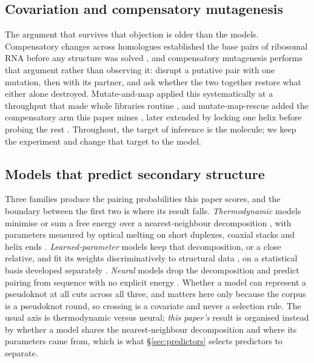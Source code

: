 \documentclass[11pt]{article}
\begin{document}
\subsection{Covariation and compensatory mutagenesis}
The argument that survives that objection is older than the models. Compensatory changes across
homologues established the base pairs of ribosomal RNA before any structure was solved
\citep{gutell1994lessons,michel1990modelling}, and compensatory mutagenesis performs that argument
rather than observing it: disrupt a putative pair with one mutation, then with its partner, and ask
whether the two together restore what either alone destroyed. Mutate-and-map
applied this systematically \citep{kladwang2011mutate,kladwang2011two,cordero2015rich,
cordero2015rna} at a throughput that made whole libraries routine
\citep{tian2014high,leppek2022combinatorial}, and mutate-map-rescue added the compensatory arm this
paper mines \citep{tian2014correcting,cheng2017rna}, later extended by locking one helix before
probing the rest \citep{tian2018allosteric}. Throughout, the target of inference is the molecule;
we keep the experiment and change that target to the model.

\subsection{Models that predict secondary structure}
\label{sec:models}
Three families produce the pairing probabilities this paper scores, and the boundary between the
first two is where its result falls. \emph{Thermodynamic} models minimise or sum a free energy over
a nearest-neighbour decomposition \citep{zuker1981optimal,mccaskill1990equilibrium,
hofacker1994fast,lorenz2011vienna}, with parameters measured by optical melting on short duplexes,
coaxial stacks and helix ends \citep{freier1986improved,walter1994coaxial,serra1995predicting,
xia1998thermodynamic,mathews1999expanded,turner2010nndb}. \emph{Learned-parameter} models keep that
decomposition, or a close relative, and fit its weights discriminatively to structural data
\citep{do2006contrafold,andronescu2007efficient,waymentsteele2022rna}, on a statistical basis
developed separately \citep{waymentsteele2021theoretical}. \emph{Neural} models drop the
decomposition and predict pairing from sequence with no explicit energy \citep{singh2019spotrna,
sato2021rna,fu2022ufold,ribonanzanet2024}. Whether a model can represent a pseudoknot at all
\citep{rivas1999dynamic,reeder2004design,bellaousov2010probknot,janssen2015pkiss} cuts across all
three, and matters here only because the corpus is a pseudoknot round, so crossing is a covariate
and never a selection rule. The usual axis is thermodynamic versus neural; \emph{this paper's}
result is organised instead by whether a model shares the nearest-neighbour decomposition and where
its parameters came from, which is what \S\ref{sec:predictors} selects predictors to separate.
\end{document}
